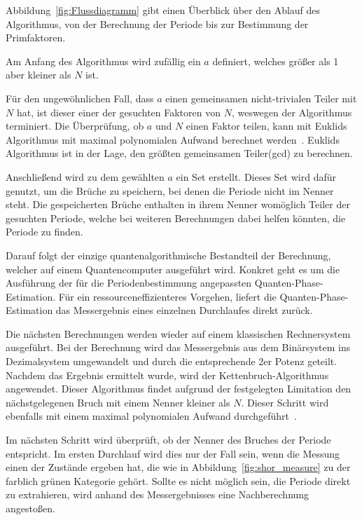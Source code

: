 \vspace{1em}

Abbildung~\ref{fig:Flussdiagramm} gibt einen Überblick über den Ablauf des Algorithmus, 
von der Berechnung der Periode bis zur Bestimmung der Primfaktoren.

Am Anfang des Algorithmus wird zufällig ein \(a\) definiert, 
welches größer als 1 aber kleiner als \(N\) ist.

Für den ungewöhnlichen Fall, dass \(a\) einen gemeinsamen nicht-trivialen Teiler mit \(N\) hat, 
ist dieser einer der gesuchten Faktoren von \(N\), 
weswegen der Algorithmus terminiert.
Die Überprüfung, ob \(a\) und \(N\) einen Faktor teilen, 
kann mit Euklids Algorithmus mit maximal polynomialen Aufwand berechnet werden~\autocite*[301]{homeister2023quantum215}. 
Euklids Algorithmus ist in der Lage, den größten gemeinsamen Teiler(gcd) zu berechnen.

Anschließend wird zu dem gewählten \(a\) ein Set erstellt.
Dieses Set wird dafür genutzt, um die Brüche zu speichern, 
bei denen die Periode nicht im Nenner steht. 
Die gespeicherten Brüche enthalten in ihrem Nenner womöglich Teiler der gesuchten Periode, 
welche bei weiteren Berechnungen dabei helfen könnten, die Periode zu finden.

Darauf folgt der einzige quantenalgorithmische Bestandteil der Berechnung, 
welcher auf einem Quantencomputer ausgeführt wird.
Konkret geht es um die Ausführung der für die Periodenbestimmung angepassten Quanten-Phase-Estimation. 
Für ein ressourceneffizienteres Vorgehen, 
liefert die Quanten-Phase-Estimation das Messergebnis eines einzelnen Durchlaufes direkt zurück. 

Die nächsten Berechnungen werden wieder auf einem klassischen Rechnersystem ausgeführt.
Bei der Berechnung wird das Messergebnis aus dem Binärsystem ins Dezimalsystem umgewandelt
und durch die entsprechende 2er Potenz geteilt.
Nachdem das Ergebnis ermittelt wurde, 
wird der Kettenbruch-Algorithmus angewendet. 
Dieser Algorithmus findet aufgrund der festgelegten Limitation den nächstgelegenen Bruch mit einem Nenner kleiner als \(N\).
Dieser Schritt wird ebenfalls mit einem maximal polynomialen Aufwand durchgeführt~\autocite[230]{nielsen_chuang_2010}.

Im nächsten Schritt wird überprüft, ob der Nenner des Bruches der Periode entspricht.
Im ersten Durchlauf wird dies nur der Fall sein, 
wenn die Messung einen der Zustände ergeben hat, 
die wie in Abbildung~\ref{fig:shor_measure} zu der farblich grünen Kategorie gehört.
Sollte es nicht möglich sein, die Periode direkt zu extrahieren, 
wird anhand des Messergebnisses eine Nachberechnung angestoßen.


